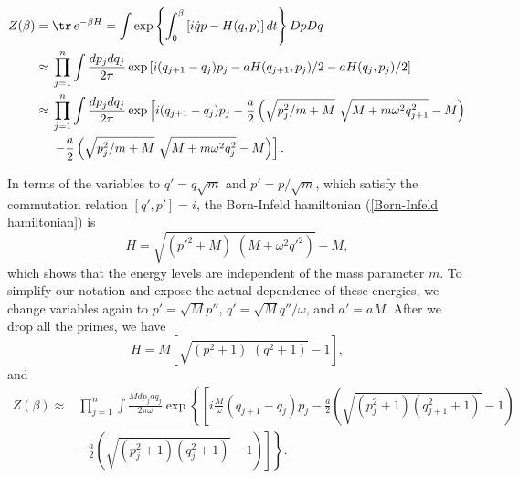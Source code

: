 \documentclass[prd,preprint,floatfix,showpacs]{revtex4-1}
\begin{document}
\begin{equation} 
   \begin{split}
 Z(\beta) ={}& \tr \, e^{-\beta H} 
=  \int \exp\left\{ \int_0^\beta \left[ i \dot q p - H(q,p) \right] dt \right\}
Dp Dq 
\\
\approx{}& \prod_{j=1}^n \int\frac{dp_j dq_j}{2\pi} 
 \exp \left[   i (q_{j+1} - q_j) p_j 
 - a H(q_{j+1},p_j)/2 - a H(q_j,p_j)/2 \right]  
 \\
\approx{}& \prod_{j=1}^n \int\frac{dp_j dq_j}{2\pi} 
 \exp \left[   i (q_{j+1} - q_j) p_j 
 - \frac{a}{2} \left(\sqrt{p^2_j/m + M} \,\,
\sqrt{M + m \omega^2 q^2_{j+1}} - M\right) \right.
\\
{}& \left. - \frac{a}{2} \left(\sqrt{p^2_j/m + M} \,\,
\sqrt{M + m \omega^2 q^2_j} - M\right)
 \right]  .
 \label {B-I partition function}
   \end{split}
\end{equation}
\par
In terms of the variables to 
\( q' = q \sqrt{m} \) and \( p' = p/\sqrt{m} \),
which satisfy the commutation relation
\( [ q', p' ] = i \), the Born-Infeld hamiltonian
(\ref {Born-Infeld hamiltonian}) is
\begin{equation}
H ={} \sqrt{ \left( p'^2 + M \right) \,\,
\left( M + \omega^2 q'^2 \right) } - M ,
\label {Born-Infeld hamiltonian reveals}
\end{equation}
which shows that the energy levels
are independent of the mass parameter \( m \)\@.
To simplify our notation and expose the actual
dependence of these energies, we change
variables again to 
\( p' = \sqrt{M} p'' \),
\( q' =  \sqrt{M} q'' / \omega \),
and  \( a' = a M \)\@.
After we drop all the primes,
we have
\begin{equation}
H ={} M \left[ \sqrt{ \left( p^2 + 1 \right) \,\,
\left( q^2 + 1 \right) } - 1 \right] ,
\label {Born-Infeld hamiltonian revealed again}
\end{equation}
and
\begin{equation} 
   \begin{split}
 Z(\beta) \approx {}& \prod_{j=1}^n \int
 \frac{Mdp_j dq_j}{2\pi \omega} 
 \exp \left\{  \left[
 i \frac{M}{\omega} (q_{j+1} - q_j) p_j 
- \frac{a}{2} \left(\sqrt{\left(p^2_j + 1 \right) 
\left( q^2_{j+1} + 1\right)} - 1\right) \right. \right.
\\
{}& \left. \left. 
- \frac{a}{2} \left(\sqrt{\left(p^2_j + 1 \right) 
\left( q^2_j + 1\right)} - 1\right) \right]
 \right\}  .
 \label {B-I partition function}
   \end{split}
\end{equation}
\end{document}
